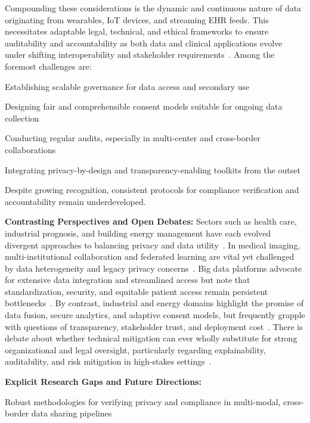 \documentclass[sigconf]{acmart}
\begin{document}
Compounding these considerations is the dynamic and continuous nature of data originating from wearables, IoT devices, and streaming EHR feeds. This necessitates adaptable legal, technical, and ethical frameworks to ensure auditability and accountability as both data and clinical applications evolve under shifting interoperability and stakeholder requirements~\cite{ref51, ref56, ref61, ref63, ref65, ref70, ref72, ref75, ref76, ref78, ref82, ref84, ref90, ref91, ref106}. Among the foremost challenges are:

Establishing scalable governance for data access and secondary use

Designing fair and comprehensible consent models suitable for ongoing data collection

Conducting regular audits, especially in multi-center and cross-border collaborations

Integrating privacy-by-design and transparency-enabling toolkits from the outset

Despite growing recognition, consistent protocols for compliance verification and accountability remain underdeveloped.

\textbf{Contrasting Perspectives and Open Debates:} Sectors such as health care, industrial prognosis, and building energy management have each evolved divergent approaches to balancing privacy and data utility~\cite{ref51, ref83, ref71, ref72, ref84}. In medical imaging, multi-institutional collaboration and federated learning are vital yet challenged by data heterogeneity and legacy privacy concerns~\cite{ref51, ref54}. Big data platforms advocate for extensive data integration and streamlined access but note that standardization, security, and equitable patient access remain persistent bottlenecks~\cite{ref82, ref84}. By contrast, industrial and energy domains highlight the promise of data fusion, secure analytics, and adaptive consent models, but frequently grapple with questions of transparency, stakeholder trust, and deployment cost~\cite{ref71, ref72, ref76, ref77}. There is debate about whether technical mitigation can ever wholly substitute for strong organizational and legal oversight, particularly regarding explainability, auditability, and risk mitigation in high-stakes settings~\cite{ref83, ref91}.

\textbf{Explicit Research Gaps and Future Directions:}
\vspace{0.5em}

Robust methodologies for verifying privacy and compliance in multi-modal, cross-border data sharing pipelines
\end{document}
